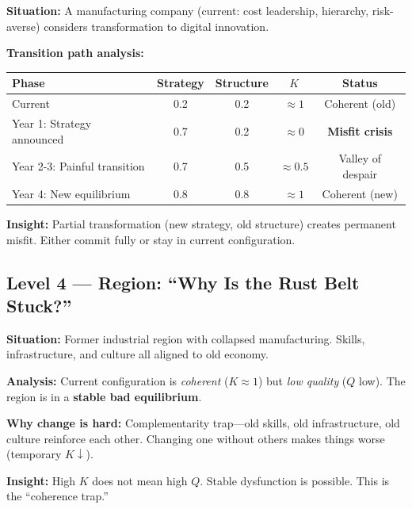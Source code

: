 \begin{tcolorbox}[colback=orange!5!white, colframe=orange!75!black,
    title=\textbf{Worked Example L=3: Organizational Change}]

\textbf{Situation:} A manufacturing company (current: cost leadership, hierarchy, risk-averse)
considers transformation to digital innovation.

\textbf{Transition path analysis:}
\begin{center}
\small
\begin{tabular}{@{}lcccc@{}}
\hline
\textbf{Phase} & \textbf{Strategy} & \textbf{Structure} & \textbf{$K$} & \textbf{Status} \\
\hline
Current & 0.2 & 0.2 & $\approx 1$ & Coherent (old) \\
Year 1: Strategy announced & 0.7 & 0.2 & $\approx 0$ & \textbf{Misfit crisis} \\
Year 2-3: Painful transition & 0.7 & 0.5 & $\approx 0.5$ & Valley of despair \\
Year 4: New equilibrium & 0.8 & 0.8 & $\approx 1$ & Coherent (new) \\
\hline
\end{tabular}
\end{center}

\textbf{Insight:} Partial transformation (new strategy, old structure) creates permanent misfit.
Either commit fully or stay in current configuration.

\end{tcolorbox}

\subsection{Level 4 — Region: ``Why Is the Rust Belt Stuck?''}

\begin{tcolorbox}[colback=orange!5!white, colframe=orange!75!black,
    title=\textbf{Worked Example L=4: Regional Lock-In}]

\textbf{Situation:} Former industrial region with collapsed manufacturing.
Skills, infrastructure, and culture all aligned to old economy.

\textbf{Analysis:}
Current configuration is \emph{coherent} ($K \approx 1$) but \emph{low quality} ($Q$ low).
The region is in a \textbf{stable bad equilibrium}.

\textbf{Why change is hard:}
Complementarity trap—old skills, old infrastructure, old culture reinforce each other.
Changing one without others makes things worse (temporary $K \downarrow$).

\textbf{Insight:} High $K$ does not mean high $Q$. Stable dysfunction is possible.
This is the ``coherence trap.''

\end{tcolorbox}

